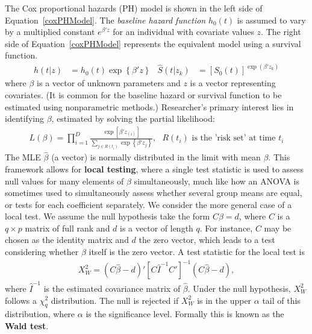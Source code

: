 \documentclass[article]{jss}
\begin{document}
The Cox proportional hazards (PH) model is shown in the left side of Equation~\eqref{coxPHModel}. The \emph{baseline hazard function} $h_0(t)$ is assumed to vary by a multiplied constant $e^{\beta'z}$ for an individual with covariate values $z$. The right side of Equation~\eqref{coxPHModel} represents the equivalent model using a survival function.
\begin{align} \label{coxPHModel}
h(t|z) &= h_0(t)\exp\left\{ \beta'z  \right\}
&\hat{S}(t|z_k) &= \left[S_0(t)\right]^{\exp\left(\beta'z_k \right)}
\end{align}
where $\beta$ is a vector of unknown parameters and $z$ is a vector representing covariates. (It is common for the baseline hazard or survival function to be estimated using nonparametric methods.) Researcher's primary interest lies in identifying $\beta$, estimated by solving the partial likelihood:
\begin{eqnarray*}
L(\beta) = \prod_{i=1}^D \frac{\exp\left[\beta'z_{(i)}\right]}{\sum_{j \in R(t_i)}\exp\left\{\beta'z_j\right\}}, \text{ }R(t_i)\text{ is the 'risk set' at time }t_i
\end{eqnarray*}
The MLE $\hat{\beta}$ (a vector) is normally distributed in the limit with mean $\beta$. This framework allows for \textbf{local testing}, where a single test statistic is used to assess null values for many elements of $\beta$ simultaneously, much like how an ANOVA is sometimes used to simultaneously assess whether several group means are equal, or tests for each coefficient separately. We consider the more general case of a local test. We assume the null hypothesis take the form $C\beta = d$, where $C$ is a $q\times p$ matrix of full rank and $d$ is a vector of length $q$. For instance, $C$ may be chosen as the identity matrix and $d$ the zero vector, which leads to a test considering whether $\beta$ itself is the zero vector. A test statistic for the local test is
\begin{eqnarray*}
X_W^2 = \left(C\hat{\beta} - d\right)'\left[C\hat{I}^{-1}C'\right]^{-1}\left(C\hat{\beta} - d\right),
\end{eqnarray*}
where $\hat{I}^{-1}$ is the estimated covariance matrix of $\hat{\beta}$. Under the null hypothesis, $X_W^2$ follows a $\chi^2_q$ distribution. The null is rejected if $X_W^2$ is in the upper $\alpha$ tail of this distribution, where $\alpha$ is the significance level. Formally this is known as the \textbf{Wald test}.

\end{document}
